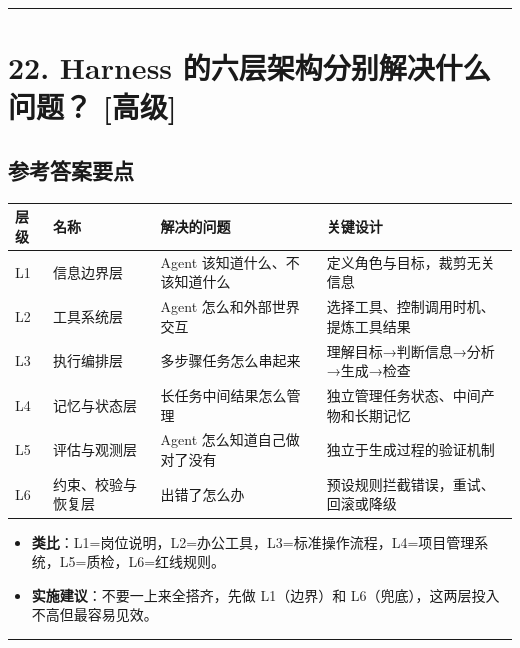 \documentclass[9pt,a4paper,twocolumn]{ctexart}
\newcommand{\lvgao}{\usebox{\badgegaobox}}
\def\lvgao{[高级]}%
\begin{document}
\vspace{2pt}
\noindent\rule{\columnwidth}{0.3pt}\vspace{2pt}



\section*{22. Harness 的六层架构分别解决什么问题？ \lvgao{}}


\subsection*{参考答案要点}

{\footnotesize
\begin{tabular}{|p{}|p{}|p{}|p{}|}
\hline
\textbf{层级} & \textbf{名称} & \textbf{解决的问题} & \textbf{关键设计} \\
\hline
L1 & 信息边界层 & Agent 该知道什么、不该知道什么 & 定义角色与目标，裁剪无关信息 \\
\hline
L2 & 工具系统层 & Agent 怎么和外部世界交互 & 选择工具、控制调用时机、提炼工具结果 \\
\hline
L3 & 执行编排层 & 多步骤任务怎么串起来 & 理解目标→判断信息→分析→生成→检查 \\
\hline
L4 & 记忆与状态层 & 长任务中间结果怎么管理 & 独立管理任务状态、中间产物和长期记忆 \\
\hline
L5 & 评估与观测层 & Agent 怎么知道自己做对了没有 & 独立于生成过程的验证机制 \\
\hline
L6 & 约束、校验与恢复层 & 出错了怎么办 & 预设规则拦截错误，重试、回滚或降级 \\
\hline
\end{tabular}
}


\begin{itemize}[itemsep=1pt, topsep=2pt]
  \item \textbf{类比}：L1=岗位说明，L2=办公工具，L3=标准操作流程，L4=项目管理系统，L5=质检，L6=红线规则。
  \item \textbf{实施建议}：不要一上来全搭齐，先做 L1（边界）和 L6（兜底），这两层投入不高但最容易见效。
\end{itemize}


\vspace{2pt}
\noindent\rule{\columnwidth}{0.3pt}\vspace{2pt}
\end{document}
